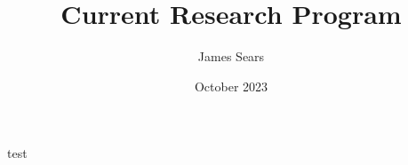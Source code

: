 \documentclass{article}
\title{Current Research Program}
\author{James Sears}
\date{October 2023}
\begin{document}
test
\end{document}
